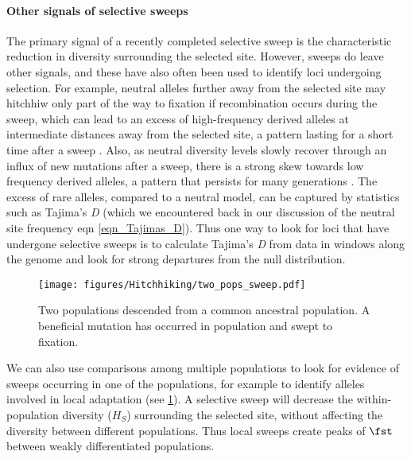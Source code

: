 \paragraph{Other signals of selective sweeps}
The primary signal of a recently completed selective sweep is the
characteristic reduction in diversity surrounding the selected site.
However, sweeps do leave other signals, and these have also often been
used to identify loci undergoing selection. 
For example, neutral alleles further away from the selected site may
hitchhiw only part of the way to fixation if recombination occurs during
the sweep, which can lead to an excess of high-frequency
derived alleles at intermediate distances away from the selected site,
a pattern lasting for a short time after a sweep \citep{Fay:00,Przeworski:02,Kim:06}.
Also, as neutral diversity levels slowly recover through an influx of
new mutations after a sweep, there is a strong skew towards low
frequency derived alleles, a pattern that persists for many
generations \citep{Braverman:95, Przeworski:02,Kim:06}. The excess of
rare alleles, compared to a neutral model, can be captured by
statistics such as Tajima's {\it D} (which
we encountered back in our discussion of the neutral site frequency eqn
\ref{eqn_Tajimas_D}). Thus one way to look for loci that have
undergone selective sweeps is to calculate Tajima's {\it D} from data in
windows along the genome and look for
strong departures from the null distribution.

\begin{figure}
\begin{center}
\texttt{[image: figures/Hitchhiking/two\_pops\_sweep.pdf]}
\end{center}
\caption{Two populations descended from a common ancestral
  population. A beneficial mutation has occurred in population and
  swept to fixation.} \label{fig:local_sweep_haps}
\end{figure}

We can also use comparisons among multiple populations to look for evidence of sweeps occurring in one of the
populations, for example to identify alleles involved in local adaptation (see \ref{fig:local_sweep_haps}). A selective sweep will decrease the within-population diversity ($H_S$)
surrounding the selected site, without affecting the diversity between different
populations. Thus local sweeps create peaks of
$\fst$ between weakly differentiated populations. 


